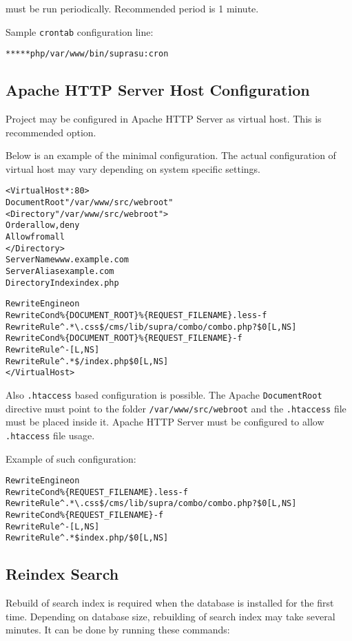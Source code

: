 \documentclass[12pt]{article}
\newcommand{\vigPathToProject}{/var/www}
\newcommand{\vigPathToSrc}{/src}
\newcommand{\vigPathToWebroot}{\vigPathToSrc/webroot}
\begin{document}
must be run periodically. Recommended period is 1 minute.

Sample \texttt{crontab} configuration line:

\begin{alltt}
* * * * * php \vigPathToProject/bin/supra su:cron
\end{alltt}

\subsection{Apache HTTP Server Host Configuration}

Project may be configured in Apache HTTP Server as virtual host. This is recommended option.

Below is an example of the minimal configuration. The actual configuration of virtual host may vary depending on system specific settings.

\begin{alltt}
<VirtualHost *:80>
  DocumentRoot "\vigPathToProject\vigPathToWebroot"
  <Directory "\vigPathToProject\vigPathToWebroot">
    Order allow,deny
    Allow from all
  </Directory>
  ServerName www.example.com
  ServerAlias example.com
  DirectoryIndex index.php

  RewriteEngine on
  RewriteCond \%\{DOCUMENT_ROOT\}\%\{REQUEST_FILENAME\}.less -f
  RewriteRule ^.*\textbackslash.css\$ /cms/lib/supra/combo/combo.php?\$0 [L,NS]  
  RewriteCond \%\{DOCUMENT_ROOT\}\%\{REQUEST_FILENAME\} -f
  RewriteRule ^ - [L,NS]
  RewriteRule ^.*\$ /index.php\$0 [L,NS]
</VirtualHost>
\end{alltt}

Also \texttt{.htaccess} based configuration is possible. The Apache \texttt{DocumentRoot} directive must point to the folder \texttt{\vigPathToProject\vigPathToWebroot} and the \texttt{.htaccess} file must be placed inside it. Apache HTTP Server must be configured to allow \texttt{.htaccess} file usage.

Example of such configuration:

\begin{alltt}
RewriteEngine on
RewriteCond \%\{REQUEST_FILENAME\}.less -f
RewriteRule ^.*\textbackslash.css\$ /cms/lib/supra/combo/combo.php?\$0 [L,NS]
RewriteCond \%\{REQUEST_FILENAME\} -f
RewriteRule ^ - [L,NS]
RewriteRule ^.*\$ index.php/\$0 [L,NS]
\end{alltt}

\subsection{Reindex Search\label{reindexSearch}}
Rebuild of search index is required when the database is installed for the first time. Depending on database size, rebuilding of search index may take several minutes. It can be done by running these commands:
\end{document}
